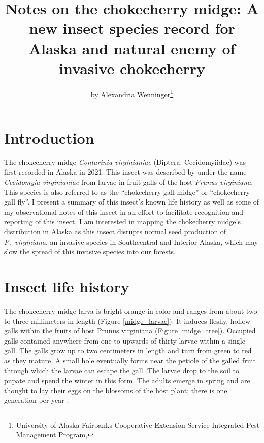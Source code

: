 \title{Notes on the chokecherry midge: A new insect species record for Alaska and natural enemy of invasive chokecherry}

\author{by Alexandria Wenninger\footnote{University of Alaska Fairbanks Cooperative Extension Service Integrated Pest Management Program, }}

\maketitle

\section{Introduction}

The chokecherry midge \textit{Contarinia virginianiae} (Diptera: Cecidomyiidae) was first recorded in Alaska in 2021. This insect was described by \citet{Felt1906} under the name \textit{Cecidomyia virginianiae} from larvae in fruit galls of the host \textit{Prunus virginiana}. This species is also referred to as the ``chokecherry gall midge'' or ``chokecherry gall fly''. I present a summary of this insect's known life history as well as some of my observational notes of this insect in an effort to facilitate recognition and reporting of this insect. I am interested in mapping the chokecherry midge's distribution in Alaska as this insect disrupts normal seed production of \textit{P.\ virginiana}, an invasive species in Southcentral and Interior Alaska, which may slow the spread of this invasive species into our forests. 

\section{Insect life history}

The chokecherry midge larva is bright orange in color and ranges from about two to three millimeters in length (Figure \ref{midge_larvae}). It induces fleshy, hollow galls within the fruits of host Prunus virginiana (Figure \ref{midge_tree}). Occupied galls contained anywhere from one to upwards of thirty larvae within a single gall. The galls grow up to two centimeters in length and turn from green to red as they mature. A small hole eventually forms near the petiole of the galled fruit through which the larvae can escape the gall. The larvae drop to the soil to pupate and spend the winter in this form. The adults emerge in spring and are thought to lay their eggs on the blossoms of the host plant; there is one generation per year \citep{Cranshaw2004}. 

